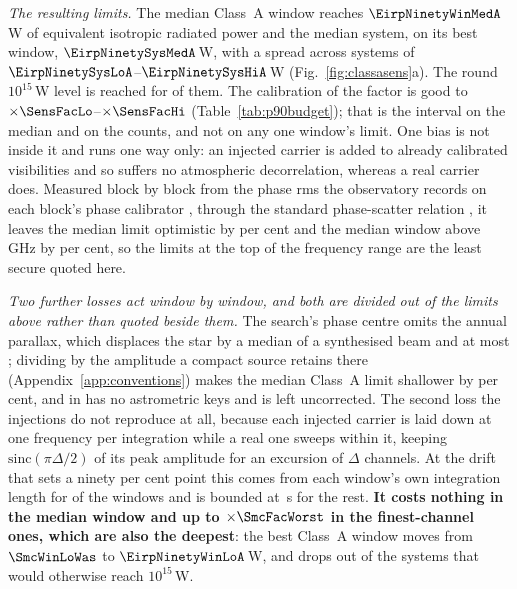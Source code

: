\emph{The resulting limits.} The median Class~A window reaches
$\EirpNinetyWinMedA$\,W of equivalent isotropic radiated power and the median
system, on its best window, $\EirpNinetySysMedA$\,W, with a spread across
systems of $\EirpNinetySysLoA$--$\EirpNinetySysHiA$\,W
(Fig.~\ref{fig:classasens}a). The round $10^{15}$\,W level is reached for
\NSysEfifteen{} of them. The calibration of the factor is good to
$\times\SensFacLo$--$\times\SensFacHi$ (Table~\ref{tab:p90budget}); that is
the interval on the median and on the counts, and not on any one window's
limit. One bias is not inside it and runs one way only: an injected carrier is
added to already calibrated visibilities and so suffers no atmospheric
decorrelation, whereas a real carrier does. Measured block by block from the
phase rms the observatory records on each block's phase calibrator
\citep[\S10.4.9]{ALMAHandbook}, through the standard phase-scatter relation
\citep[Eq.~3]{Richards2022}, it leaves the median limit optimistic by
\SensDecorPct{} per cent and the median window above \SensDecorHiGHz{}\,GHz by
\SensDecorHiPct{} per cent, so the limits at the top of the frequency range
are the least secure quoted here.

\emph{Two further losses act window by window, and both are divided out of
the limits above rather than quoted beside them.} The search's phase centre
omits the annual parallax, which displaces the star by a median
\SensBeamsMed{} of a synthesised beam and at most \SensBeamsMax; dividing by
the amplitude a compact source retains there
(Appendix~\ref{app:conventions}) makes the median Class~A limit shallower by
\PxaShiftWinPct{} per cent, and \PxaMissingStar{} in \PxaMissingEb{} has no
astrometric keys and is left uncorrected. The second loss the injections do
not reproduce at all, because each injected carrier is laid down at one
frequency per integration while a real one sweeps within it, keeping
$\mathrm{sinc}(\pi\Delta/2)$ of its peak amplitude for an excursion of
$\Delta$ channels. At the drift that sets a ninety per cent point this comes
from each window's own integration length for \SmcNMeas{} of the \NWindows{}
windows and is bounded at \SmcDtCeil\,s for the rest.
\textbf{It costs nothing in the median window and up to $\times\SmcFacWorst$
in the \SmcNAbove{} finest-channel ones, which are also the deepest}: the best
Class~A window moves from $\SmcWinLoWas$ to $\EirpNinetyWinLoA$\,W, and
\SmcLostStars{} drops out of the \SmcSysEfifteenWas{} systems that would
otherwise reach $10^{15}$\,W.

